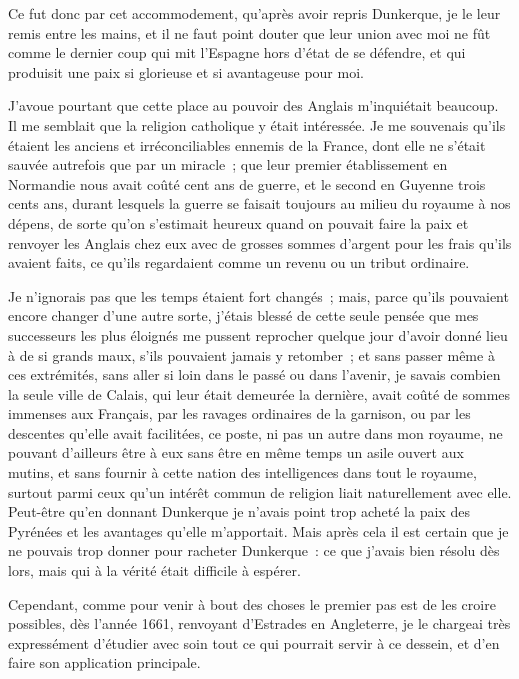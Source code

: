\documentclass[french,twoside]{book} %
\begin{document}
Ce fut donc par cet accommodement, qu’après avoir repris Dunkerque, je le leur remis entre les mains, et il ne faut point douter que leur union avec moi ne fût comme le dernier coup qui mit l’Espagne hors d’état de se défendre, et qui produisit une paix si glorieuse et si avantageuse pour moi.\par
J’avoue pourtant que cette place au pouvoir des Anglais m’inquiétait beaucoup. Il me semblait que la religion catholique y était intéressée. Je me souvenais qu’ils étaient les anciens et irréconciliables ennemis de la France, dont elle ne s’était sauvée autrefois que par un miracle ; que leur premier établissement en Normandie nous avait coûté cent ans de guerre, et le second en Guyenne trois cents ans, durant lesquels la guerre se faisait toujours au milieu du royaume à nos dépens, de sorte qu’on s’estimait heureux quand on pouvait faire la paix et renvoyer les Anglais chez eux avec de grosses sommes d’argent pour les frais qu’ils avaient faits, ce qu’ils regardaient comme un revenu ou un tribut ordinaire.\par
Je n’ignorais pas que les temps étaient fort changés ; mais, parce qu’ils pouvaient encore changer d’une autre sorte, j’étais blessé de cette seule pensée que mes successeurs les plus éloignés me pussent reprocher quelque jour d’avoir donné lieu à de si grands maux, s’ils pouvaient jamais y retomber ; et sans passer même à ces extrémités, sans aller si loin dans le passé ou dans l’avenir, je savais combien la seule ville de Calais, qui leur était demeurée la dernière, avait coûté de sommes immenses aux Français, par les ravages ordinaires de la garnison, ou par les descentes qu’elle avait facilitées, ce poste, ni pas un autre dans mon royaume, ne pouvant d’ailleurs être à eux sans être en même temps un asile ouvert aux mutins, et sans fournir à cette nation des intelligences dans tout le royaume, surtout parmi ceux qu’un intérêt commun de religion liait naturellement avec elle. Peut-être qu’en donnant Dunkerque je n’avais point trop acheté la paix des Pyrénées et les avantages qu’elle m’apportait. Mais après cela il est certain que je ne pouvais trop donner pour racheter Dunkerque : ce que j’avais bien résolu dès lors, mais qui à la vérité était difficile à espérer.\par
Cependant, comme pour venir à bout des choses le premier pas est de les croire possibles, dès l’année 1661, renvoyant d’Estrades en Angleterre, je le chargeai très expressément d’étudier avec soin tout ce qui pourrait servir à ce dessein, et d’en faire son application principale.\par
\end{document}
